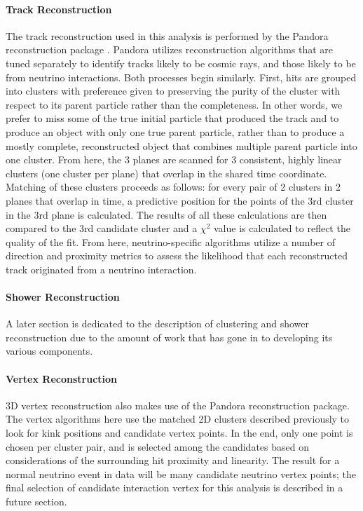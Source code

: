 \paragraph{Track Reconstruction}
The track reconstruction used in this analysis is performed by the Pandora reconstruction package \cite{bib:pandora}.  Pandora utilizes reconstruction algorithms that are tuned separately to identify tracks likely to be cosmic rays, and those likely to be from neutrino interactions. Both processes begin similarly.  First, hits are grouped into clusters with preference given to preserving the purity of the cluster with respect to its parent particle rather than the completeness.  In other words, we prefer to miss some of the true initial particle that produced the track and to produce an object with only one true parent particle, rather than to produce a mostly complete, reconstructed object that combines multiple parent particle into one cluster.  From here, the 3 planes are scanned for 3 consistent, highly linear clusters (one cluster per plane) that overlap in the shared time coordinate.  Matching of these clusters proceeds as follows:  for every pair of 2 clusters in 2 planes that overlap in time, a predictive position for the points of the 3rd cluster in the 3rd plane is calculated. The results of all these calculations are then compared to the 3rd candidate cluster and a $\chi^2$ value is calculated to reflect the quality of the fit. From here, neutrino-specific algorithms utilize a number of direction and proximity metrics to assess the likelihood that each reconstructed track originated from a neutrino interaction. 
\paragraph{Shower Reconstruction}
A later section is dedicated to the description of clustering and shower reconstruction due to the amount of work that has gone in to developing its various components.

\paragraph{Vertex Reconstruction}
3D vertex reconstruction also makes use of the Pandora reconstruction package. The vertex algorithms here use the matched 2D clusters described previously to look for kink positions and candidate vertex points. In the end, only one point is chosen per cluster pair, and is selected among the candidates based on considerations of the surrounding hit proximity and linearity. The result for a normal neutrino event in data will be many candidate neutrino vertex points; the final selection of candidate interaction vertex for this analysis is described in a future section.

